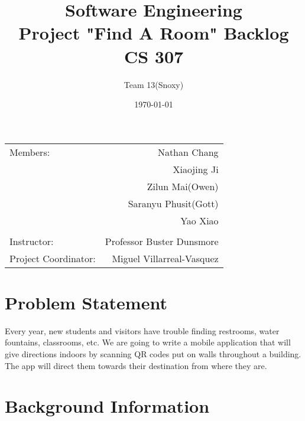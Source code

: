 \documentclass[12pt]{article}
\title{Software Engineering \\ Project "Find A Room" Backlog \\ CS 307} %
\author{Team \textsc{13}(Snoxy)} %
\date{\today} %
\begin{document}
\maketitle %

\begin{center}
\begin{tabular}{l r}
Members: & Nathan Chang \\ %
& Xiaojing Ji \\
& Zilun Mai(Owen) \\
& Saranyu Phusit(Gott) \\
& Yao Xiao \\
\\
\bigskip
Instructor: & Professor Buster Dunsmore \\%
Project Coordinator: & Miguel Villarreal-Vasquez %

\end{tabular}
\end{center}




\newpage
\section{Problem Statement}

Every year, new students and visitors have trouble finding restrooms, water fountains, classrooms, etc. We are going to write a mobile application that will give directions indoors by scanning QR codes put on walls throughout a building. The app will direct them towards their destination from where they are.


\section{Background Information}
\end{document}
